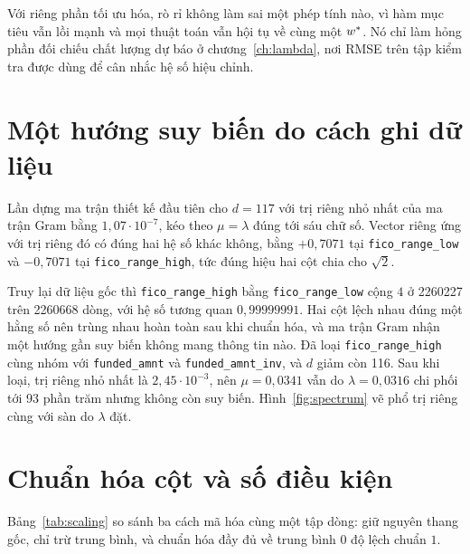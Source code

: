 \documentclass[12pt, a4paper, oneside]{report}
\theoremstyle{definition}
\begin{document}
Với riêng phần tối ưu hóa, rò rỉ không làm sai một phép tính nào, vì hàm mục tiêu
vẫn lồi mạnh và mọi thuật toán vẫn hội tụ về cùng một $w^{*}$. Nó chỉ làm hỏng
phần đối chiếu chất lượng dự báo ở chương~\ref{ch:lambda}, nơi RMSE trên tập
kiểm tra được dùng để cân nhắc hệ số hiệu chỉnh.

\section{Một hướng suy biến do cách ghi dữ liệu}

Lần dựng ma trận thiết kế đầu tiên cho $d = 117$ với trị riêng nhỏ nhất của ma
trận Gram bằng $1{,}07 \cdot 10^{-7}$, kéo theo $\mu = \lambda$ đúng tới sáu chữ
số. Vector riêng ứng với trị riêng đó có đúng hai hệ số khác không, bằng
$+0{,}7071$ tại \texttt{fico\_range\_low} và $-0{,}7071$ tại
\texttt{fico\_range\_high}, tức đúng hiệu hai cột chia cho $\sqrt{2}$.

Truy lại dữ liệu gốc thì \texttt{fico\_range\_high} bằng
\texttt{fico\_range\_low} cộng $4$ ở \num{2260227} trên \num{2260668} dòng, với
hệ số tương quan $0{,}99999991$. Hai cột lệch nhau đúng một hằng số nên trùng
nhau hoàn toàn sau khi chuẩn hóa, và ma trận Gram nhận một hướng gần suy biến
không mang thông tin nào. Đã loại \texttt{fico\_range\_high} cùng nhóm với
\texttt{funded\_amnt} và \texttt{funded\_amnt\_inv}, và $d$ giảm còn 116. Sau khi
loại, trị riêng nhỏ nhất là $2{,}45 \cdot 10^{-3}$, nên $\mu = 0{,}0341$ vẫn do
$\lambda = 0{,}0316$ chi phối tới 93 phần trăm nhưng không còn suy biến.
Hình~\ref{fig:spectrum} vẽ phổ trị riêng cùng với sàn do $\lambda$ đặt.


\section{Chuẩn hóa cột và số điều kiện}

Bảng~\ref{tab:scaling} so sánh ba cách mã hóa cùng một tập dòng: giữ nguyên thang
gốc, chỉ trừ trung bình, và chuẩn hóa đầy đủ về trung bình $0$ độ lệch chuẩn $1$.
\end{document}
